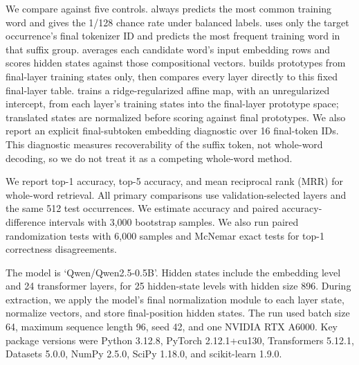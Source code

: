 We compare against five controls. \majorityword always predicts the most common training word and gives the 1/128 chance rate under balanced labels. \finalmajority uses only the target occurrence's final tokenizer ID and predicts the most frequent training word in that suffix group. \meansubtok averages each candidate word's input embedding rows and scores hidden states against those compositional vectors. \rawproto builds prototypes from final-layer training states only, then compares every layer directly to this fixed final-layer table. \ridgeitl trains a ridge-regularized affine map, with an unregularized intercept, from each layer's training states into the final-layer prototype space; translated states are normalized before scoring against final prototypes. We also report an explicit final-subtoken embedding diagnostic over 16 final-token IDs. This diagnostic measures recoverability of the suffix token, not whole-word decoding, so we do not treat it as a competing whole-word method.

We report top-1 accuracy, top-5 accuracy, and mean reciprocal rank (MRR) for whole-word retrieval. All primary comparisons use validation-selected layers and the same 512 test occurrences. We estimate accuracy and paired accuracy-difference intervals with 3,000 bootstrap samples. We also run paired randomization tests with 6,000 samples and McNemar exact tests for top-1 correctness disagreements.

The model is `Qwen/Qwen2.5-0.5B'. Hidden states include the embedding level and 24 transformer layers, for 25 hidden-state levels with hidden size 896. During extraction, we apply the model's final normalization module to each layer state, normalize vectors, and store final-position hidden states. The run used batch size 64, maximum sequence length 96, seed 42, and one NVIDIA RTX A6000. Key package versions were Python 3.12.8, PyTorch 2.12.1+cu130, Transformers 5.12.1, Datasets 5.0.0, NumPy 2.5.0, SciPy 1.18.0, and scikit-learn 1.9.0.
